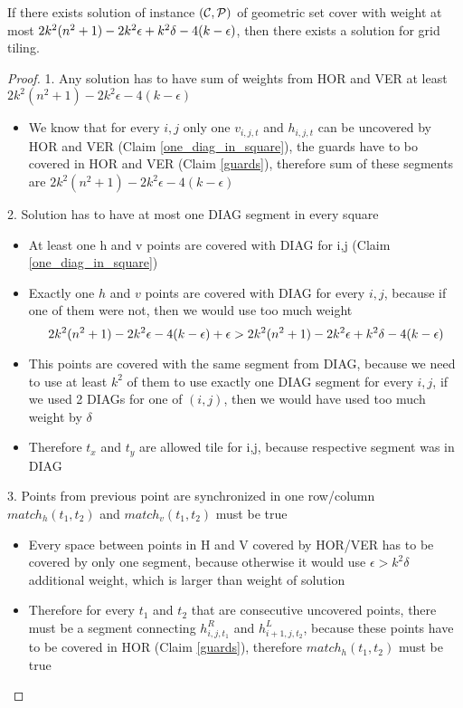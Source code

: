 \begin{lemma}
	If there exists solution  of instance $(\mathcal{C}, \mathcal{P})$
	of geometric set cover
	with weight at most $2k^2(n^2+1) - 2k^2\epsilon +k^2\delta -4(k-\epsilon)$,
	then there exists a solution for grid tiling.
\end{lemma}

\begin{proof}
1. Any solution has to have sum of weights from HOR and VER at least
$2k^2(n^2+1) -2k^2\epsilon -4(k-\epsilon)$
\begin{itemize}
\item We know that for every $i,j$ only one $v_{i,j,t}$ and $h_{i,j,t}$
can be uncovered by HOR and VER (Claim \ref{one_diag_in_square}),
the guards have to bo covered in HOR and VER (Claim \ref{guards}),
therefore sum of these segments are
$2k^2(n^2+1) -2k^2\epsilon -4(k-\epsilon)$
\end{itemize}

2. Solution has to have at most one DIAG segment in every square
\begin{itemize}
\item At least one h and v points are covered with DIAG for i,j
	(Claim \ref{one_diag_in_square})
\item Exactly one $h$ and $v$ points are covered with DIAG for every $i,j$,
because if one of them were not, then we would use too much weight
$$2k^2(n^2+1) -2k^2\epsilon -4(k-\epsilon) + \epsilon > 2k^2(n^2+1) - 2k^2\epsilon +k^2\delta -4(k-\epsilon)$$
\item This points are covered with the same segment from DIAG,
because we need to use at least $k^2$ of them to use
exactly one DIAG segment for every $i,j$, if we used 2 DIAGs
for one of $(i,j)$, then we would have used too much weight by $\delta$
\item Therefore $t_x$ and $t_y$ are allowed tile for i,j,
because respective segment was in DIAG
\end{itemize}

3. Points from previous point are synchronized in one row/column
$match_h(t_1,t_2)$ and $match_v(t_1,t_2)$ must be true
\begin{itemize}
\item Every space between points in H and V covered by HOR/VER
has to be covered by only one segment, because otherwise it would
use $\epsilon > k^2\delta$ additional weight, which is larger than
weight of solution
\item Therefore for every $t_1$ and $t_2$ that are consecutive
uncovered points, there must be a segment connecting
$h^R_{i,j,t_1}$ and $h^L_{i+1,j,t_2}$, because these points
have to be covered in HOR (Claim \ref{guards}),
therefore $match_h(t_1,t_2)$ must be true
\end{itemize}
\end{proof}

